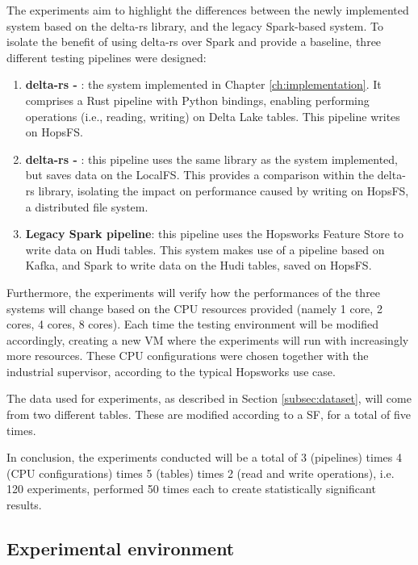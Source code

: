 The experiments aim to highlight the differences between the newly implemented system based on the delta-rs library, and the legacy Spark-based system. To isolate the benefit of using delta-rs over Spark and provide a baseline, three different testing pipelines were designed:
\begin{enumerate}
    \item \textbf{delta-rs - }: the system implemented in Chapter \ref{ch:implementation}. It comprises a Rust pipeline with Python bindings, enabling performing operations (i.e., reading, writing) on Delta Lake tables. This pipeline writes on \gls{HopsFS}.
    \item \textbf{delta-rs - }: this pipeline uses the same library as the system implemented, but saves data on the \gls{LocalFS}. This provides a comparison within the delta-rs library, isolating the impact on performance caused by writing on \gls{HopsFS}, a distributed file system.
    \item \textbf{Legacy Spark pipeline}: this pipeline uses the Hopsworks Feature Store to write data on Hudi tables. This system makes use of a pipeline based on Kafka, and Spark to write data on the Hudi tables, saved on \gls{HopsFS}. 
\end{enumerate}

Furthermore, the experiments will verify how the performances of the three systems will change based on the \gls{CPU} resources provided (namely 1 core, 2 cores, 4 cores, 8 cores). Each time the testing environment will be modified accordingly, creating a new \gls{VM} where the experiments will run with increasingly more resources. These \gls{CPU} configurations were chosen together with the industrial supervisor, according to the typical Hopsworks use case.

The data used for experiments, as described in Section \ref{subsec:dataset}, will come from two different tables. These are modified according to a \gls{SF}, for a total of five times.

In conclusion, the experiments conducted will be a total of 3 (pipelines) times 4 (\gls{CPU} configurations) times 5 (tables) times 2 (read and write operations), i.e. 120 experiments, performed 50 times each to create statistically significant results.

\subsection{Experimental environment}

